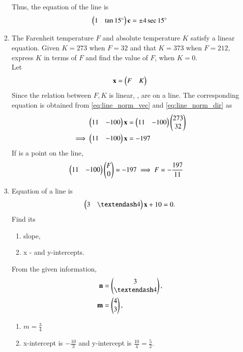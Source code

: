 \begin{enumerate}[label=\arabic*.,ref=\thesubsection.\theenumi]
Thus, the equation of the line is 
\begin{align}
\begin{pmatrix}1 &\tan 15\degree\end{pmatrix} \mathbf{c} = \pm 4 \sec 15\degree
\end{align}
\item The Farenheit temperature $F$ and absolute temperature $K$ satisfy a linear equation.  Given $K=273$ when $F=32$ and that $K=373$  when $F=212$, express $K$ in terms of $F$ and find the value of $F$, when $K=0$.
%
\\
\solution Let 
\begin{align}
\mathbf{x}=\begin{pmatrix}F & K\end{pmatrix} 
\end{align}
%
Since the relation between $F, K$ is linear, ,  are on a line.  The corresponding equation is obtained from \eqref{eq:line_norm_vec} and \eqref{eq:line_norm_dir} as 
%
\begin{align}
\begin{pmatrix}11 & -100\end{pmatrix}\mathbf{x} &= \begin{pmatrix}11 & -100\end{pmatrix}\begin{pmatrix}273\\32\end{pmatrix} 
\\
\implies \begin{pmatrix}11 & -100\end{pmatrix}\mathbf{x} &= -197
\end{align}
%
If  is a point on the line, 
%
\begin{align}
\begin{pmatrix}11 & -100\end{pmatrix}\begin{pmatrix}F\\0\end{pmatrix} &= -197
\implies F = -\frac{197}{11}
\end{align}
%
\item Equation of a line is 
\begin{align}
\myvec{3 & – 4}\vec{x} + 10 = 0. 
\end{align}
Find its 
\begin{enumerate}
\item  slope, 
\item  x - and y-intercepts.
\end{enumerate}
%
\solution From the given information, 
%
\begin{align}
\vec{n} &= \myvec{3 \\ – 4}, 
\\
\vec{m} &= \myvec{4 \\ 3}, 
\end{align}
%
\begin{enumerate}
\item $m = \frac{3}{4}$
\item x-intercept is $-\frac{10}{3}$ and y-intercept is $\frac{10}{4} = \frac{5}{2}$.
\end{enumerate}

\end{enumerate}
